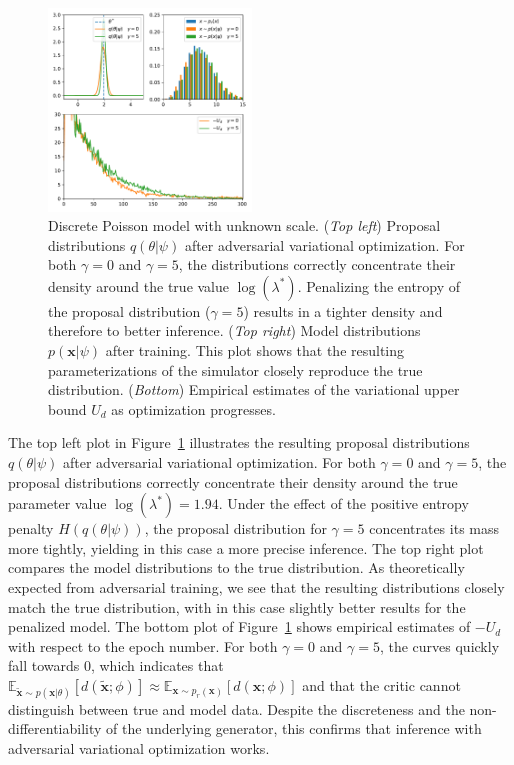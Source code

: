 \documentclass[twocolumn,superscriptaddress,aps]{revtex4-1}
\theoremstyle{plain}
\begin{document}
\begin{figure}
    \centering
    \includegraphics[width=0.48\textwidth]{figures/poisson.pdf}
    \caption{Discrete Poisson model with unknown scale.
             ({\it Top left}) Proposal distributions $q(\theta|\psi)$ after adversarial variational optimization. For both $\gamma=0$ and $\gamma=5$, the distributions correctly concentrate their density around
                        the true value $\log(\lambda^*)$. Penalizing the entropy of the proposal distribution ($\gamma=5$) results in a tighter density and therefore to better inference.
             ({\it Top right}) Model distributions $p(\mathbf{x}|\psi)$ after training. This plot shows that the resulting parameterizations of the simulator closely reproduce the true distribution.
             ({\it Bottom}) Empirical estimates of the variational upper bound $U_d$ as optimization progresses.
             }\label{fig:poisson}
\end{figure}

The top left plot in Figure~\ref{fig:poisson} illustrates the resulting proposal
distributions $q(\theta|\psi)$ after adversarial variational optimization.  For
both $\gamma=0$ and $\gamma=5$, the proposal distributions correctly concentrate
their density around the true parameter value $\log(\lambda^*) = 1.94$. Under
the effect of the positive entropy penalty $H(q(\theta|\psi))$,
the proposal distribution for $\gamma=5$ concentrates its mass more tightly,
yielding in this case a more precise inference.  The top right plot compares the
model distributions to the true distribution.  As theoretically expected from
adversarial training, we see that the resulting distributions closely match
the true distribution, with in this case slightly  better results for the penalized
model.  The bottom plot of Figure~\ref{fig:poisson} shows empirical estimates
of $-U_d$ with respect to the epoch number. For both $\gamma=0$ and $\gamma=5$,
the curves quickly fall towards $0$, which indicates that
$\mathbb{E}_{\tilde{\mathbf{x}} \sim p(\mathbf{x}|\theta)}
[d(\tilde{\mathbf{x}};\phi)] \approx \mathbb{E}_{\mathbf{x} \sim
p_r(\mathbf{x})} [d(\mathbf{x};\phi)]$ and that the critic cannot distinguish
between true and model data. Despite the discreteness and the
non-differentiability of the underlying generator, this confirms that inference
with adversarial variational optimization works.
\end{document}
